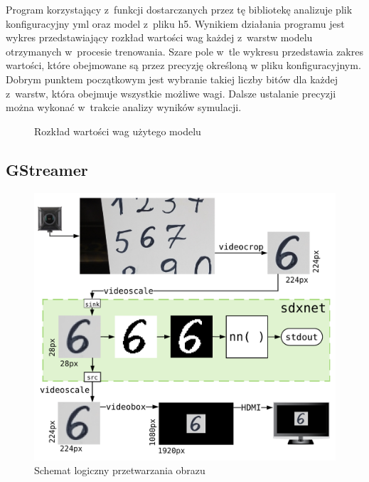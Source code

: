 \documentclass[12pt, oneside, a4paper]{article}
\begin{document}
Program korzystający z~funkcji dostarczanych przez tę bibliotekę
analizuje plik konfiguracyjny yml oraz model z~pliku h5.
Wynikiem działania programu jest wykres przedstawiający
rozkład wartości wag każdej z~warstw modelu otrzymanych w~procesie trenowania.
Szare pole w~tle wykresu
przedstawia zakres wartości, które obejmowane są przez precyzję określoną
w pliku konfiguracyjnym. Dobrym punktem początkowym jest wybranie takiej
liczby bitów dla każdej z~warstw, która obejmuje wszystkie możliwe wagi.
Dalsze ustalanie precyzji można wykonać w~trakcie analizy wyników
symulacji.
\begin{figure}[H]
  \centering
  
  \caption{Rozkład wartości wag użytego modelu}\label{fig:weights_dist}
\end{figure}


\subsection{GStreamer}\label{sec:GStreamer}
\begin{figure}[h]
  \centering
  \includegraphics[width=0.95\linewidth]{figures/image_flow.png}
  \caption{Schemat logiczny przetwarzania obrazu}\label{fig:image_flow}
\end{figure}
\end{document}
